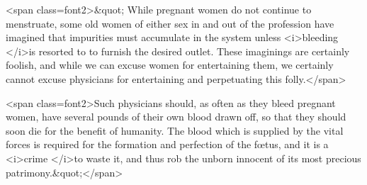 <span class=font2>&quot; While pregnant women do not continue to menstruate, some old
women of either sex in and out of the profession have imagined that
impurities must accumulate in the system unless <i>bleeding </i>is resorted to
to furnish the desired outlet. These imaginings are certainly foolish,
and while we can excuse women for entertaining them, we certainly
cannot excuse physicians for entertaining and perpetuating this folly.</span>

<span class=font2>Such physicians should, as often as they bleed pregnant women,
have several pounds of their own blood drawn off, so that they should
soon die for the benefit of humanity. The blood which is supplied by
the vital forces is required for the formation and perfection of the fœtus,
and it is a <i>crime </i>to waste it, and thus rob the unborn innocent of its
most precious patrimony.&quot;</span>
